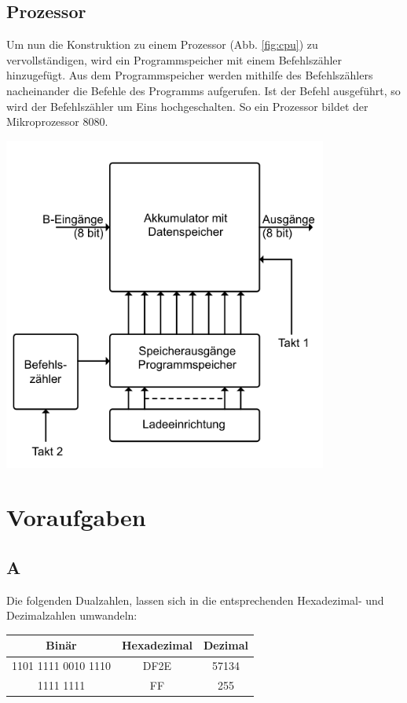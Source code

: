 \documentclass[10pt]{article}
\newenvironment{Figure}
  {\par\medskip\noindent\minipage{\linewidth}}
  {\endminipage\par\medskip}
\begin{document}
\begin{multicols}{2}
	\subsection{Prozessor}
	Um nun die Konstruktion zu einem Prozessor (Abb. \ref{fig:cpu}) zu vervollständigen, wird ein Programmspeicher mit einem Befehlszähler hinzugefügt. Aus dem Programmspeicher werden mithilfe des Befehlszählers nacheinander die Befehle des Programms aufgerufen. Ist der Befehl ausgeführt, so wird der Befehlszähler um Eins hochgeschalten. So ein Prozessor bildet der Mikroprozessor 8080.
	\begin{Figure}
		\centering\includegraphics[width=0.8\textwidth]{cpu.png}
		\label{fig:cpu}
	\end{Figure}
	\section{Voraufgaben}
	\subsection*{A}
	Die folgenden Dualzahlen, lassen sich in die entsprechenden Hexadezimal- und Dezimalzahlen umwandeln:
	\begin{center}
		\begin{tabular}{|c|c|c|}
			\hline
			Binär               & Hexadezimal & Dezimal \\
			\hline
			1101 1111 0010 1110 & DF2E        & 57134   \\
			1111 1111           & FF          & 255     \\
			\hline
		\end{tabular}
	\end{center}

\end{multicols}
\end{document}
